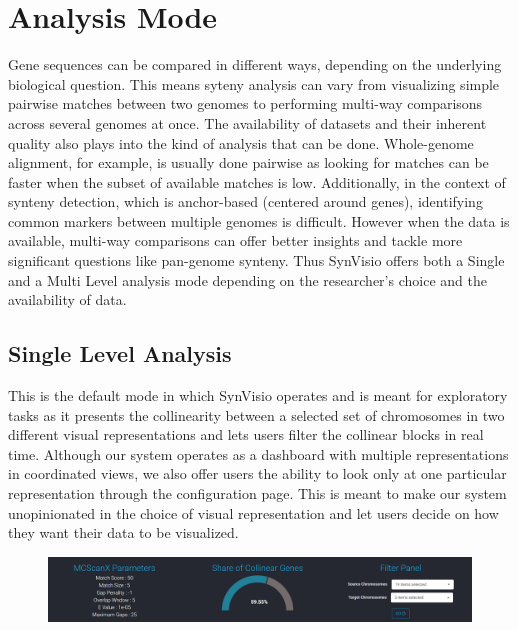 \section{Analysis Mode}
Gene sequences can be compared in different ways, depending on the underlying biological question. This means syteny analysis can vary from visualizing simple pairwise matches between two genomes to performing  multi-way comparisons across several genomes at once. The availability of datasets and their inherent quality also plays into the kind of analysis that can be done. Whole-genome alignment, for example, is usually done pairwise as looking for matches can be faster when the subset of available matches is low. Additionally, in the context of synteny detection, which is anchor-based (centered around genes), identifying common markers between multiple genomes is difficult\cite{wang2012mcscanx}. However when the data is available, multi-way comparisons can offer better insights and tackle more significant questions like pan-genome synteny. Thus SynVisio offers both a Single and a Multi Level analysis mode depending on the researcher's choice and the availability of data.

\subsection{Single Level Analysis}
This is the default mode in which SynVisio operates and is meant for exploratory tasks as it presents the collinearity between a selected set of chromosomes in two different visual representations and lets users filter the collinear blocks in real time. Although our system operates as a dashboard with multiple representations in coordinated views, we also offer users the ability to look only at one particular representation through the configuration page. This is meant to make our system unopinionated in the choice of visual representation and let users decide on how they want their data to be visualized. 

\begin{figure}
  \centering
  \includegraphics[width=1\linewidth]{images/ch_5_baseparameters.PNG}
  \label{fig:ch_5_baseparameters}
\end{figure}


